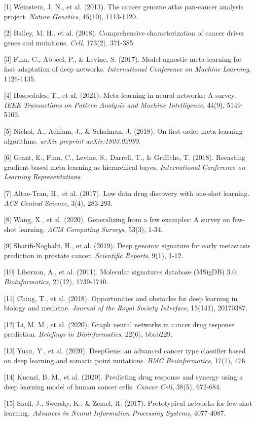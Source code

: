 \documentclass{article}
\begin{document}
{
\small

[1] Weinstein, J. N., et al. (2013). The cancer genome atlas pan-cancer analysis project. \textit{Nature Genetics}, 45(10), 1113-1120.

[2] Bailey, M. H., et al. (2018). Comprehensive characterization of cancer driver genes and mutations. \textit{Cell}, 173(2), 371-385.

[3] Finn, C., Abbeel, P., \& Levine, S. (2017). Model-agnostic meta-learning for fast adaptation of deep networks. \textit{International Conference on Machine Learning}, 1126-1135.

[4] Hospedales, T., et al. (2021). Meta-learning in neural networks: A survey. \textit{IEEE Transactions on Pattern Analysis and Machine Intelligence}, 44(9), 5149-5169.

[5] Nichol, A., Achiam, J., \& Schulman, J. (2018). On first-order meta-learning algorithms. \textit{arXiv preprint arXiv:1803.02999}.

[6] Grant, E., Finn, C., Levine, S., Darrell, T., \& Griffiths, T. (2018). Recasting gradient-based meta-learning as hierarchical bayes. \textit{International Conference on Learning Representations}.

[7] Altae-Tran, H., et al. (2017). Low data drug discovery with one-shot learning. \textit{ACS Central Science}, 3(4), 283-293.

[8] Wang, X., et al. (2020). Generalizing from a few examples: A survey on few-shot learning. \textit{ACM Computing Surveys}, 53(3), 1-34.

[9] Sharifi-Noghabi, H., et al. (2019). Deep genomic signature for early metastasis prediction in prostate cancer. \textit{Scientific Reports}, 9(1), 1-12.

[10] Liberzon, A., et al. (2011). Molecular signatures database (MSigDB) 3.0. \textit{Bioinformatics}, 27(12), 1739-1740.

[11] Ching, T., et al. (2018). Opportunities and obstacles for deep learning in biology and medicine. \textit{Journal of the Royal Society Interface}, 15(141), 20170387.

[12] Li, M. M., et al. (2020). Graph neural networks in cancer drug response prediction. \textit{Briefings in Bioinformatics}, 22(6), bbab229.

[13] Yuan, Y., et al. (2020). DeepGene: an advanced cancer type classifier based on deep learning and somatic point mutations. \textit{BMC Bioinformatics}, 17(1), 476.

[14] Kuenzi, B. M., et al. (2020). Predicting drug response and synergy using a deep learning model of human cancer cells. \textit{Cancer Cell}, 38(5), 672-684.

[15] Snell, J., Swersky, K., \& Zemel, R. (2017). Prototypical networks for few-shot learning. \textit{Advances in Neural Information Processing Systems}, 4077-4087.

}
\end{document}
